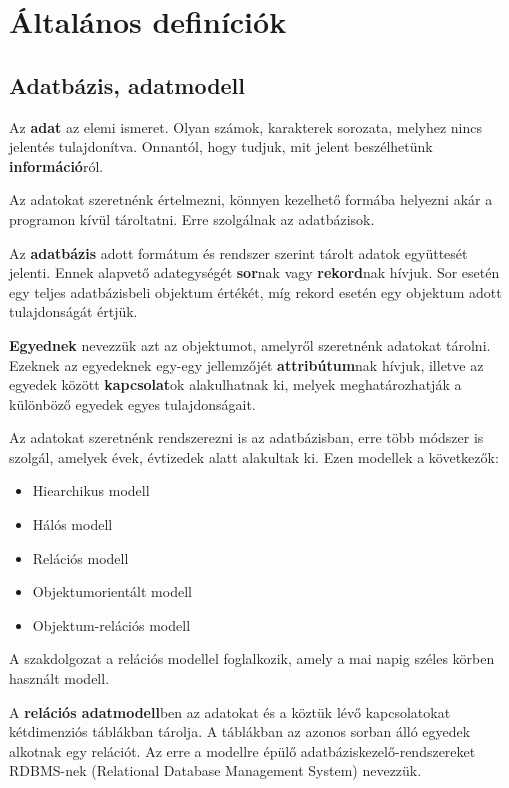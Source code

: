 \chapter{Általános definíciók}
\section{Adatbázis, adatmodell}

\begin{defi}[Adat]
Az \textbf{adat} az elemi ismeret. Olyan számok, karakterek sorozata, melyhez nincs jelentés tulajdonítva. Onnantól, hogy tudjuk, mit jelent beszélhetünk \textbf{információ}ról. 
\end{defi}

Az adatokat szeretnénk értelmezni, könnyen kezelhető formába helyezni akár a programon kívül tároltatni. Erre szolgálnak az adatbázisok.

\begin{defi}
Az \textbf{adatbázis} adott formátum és rendszer szerint tárolt adatok együttesét jelenti. Ennek alapvető adategységét \textbf{sor}nak vagy \textbf{rekord}nak hívjuk. Sor esetén egy teljes adatbázisbeli objektum értékét, míg rekord esetén egy objektum adott tulajdonságát értjük.
\end{defi}

\begin{defi}
\textbf{Egyednek} nevezzük azt az objektumot, amelyről szeretnénk adatokat tárolni. Ezeknek az egyedeknek egy-egy jellemzőjét \textbf{attribútum}nak hívjuk, illetve az egyedek között \textbf{kapcsolat}ok alakulhatnak ki, melyek meghatározhatják a különböző egyedek egyes tulajdonságait.
\end{defi}

Az adatokat szeretnénk rendszerezni is az adatbázisban, erre több módszer is szolgál, amelyek évek, évtizedek alatt alakultak ki. Ezen modellek a következők:
\begin{itemize}
    \item Hiearchikus modell
    \item Hálós modell
    \item Relációs modell
    \item Objektumorientált modell
    \item Objektum-relációs modell
\end{itemize}
A szakdolgozat a relációs modellel foglalkozik, amely a mai napig széles körben használt modell.

\begin{defi}
A \textbf{relációs adatmodell}ben az adatokat és a köztük lévő kapcsolatokat kétdimenziós táblákban tárolja. A táblákban az azonos sorban álló egyedek alkotnak egy relációt. Az erre a modellre épülő adatbáziskezelő-rendszereket RDBMS-nek (Relational Database Management System) nevezzük.
\end{defi}

